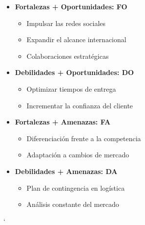 \documentclass[12pt]{article}
\begin{document}
\begin{itemize}
	\item \textbf{Fortalezas + Oportunidades: FO} 

	\begin{itemize}
		\item Impulsar las redes sociales
		
		\item Expandir el alcance internacional
		
		\item Colaboraciones estratégicas

	\end{itemize}

	\item \textbf{Debilidades + Oportunidades: DO}

	\begin{itemize}
		\item Optimizar tiempos de entrega
		
		\item Incrementar la confianza del cliente

	\end{itemize}

	\item \textbf{Fortalezas + Amenazas: FA}

	\begin{itemize}
		\item Diferenciación frente a la competencia
		
		\item Adaptación a cambios de mercado

	\end{itemize}

	\item \textbf{Debilidades + Amenazas: DA}

	\begin{itemize}
		\item Plan de contingencia en logística
		
		\item Análisis constante del mercado

	\end{itemize}

\end{itemize}

`
\end{document}
